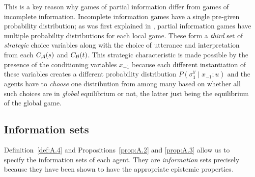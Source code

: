 This is a key reason why games of partial information differ from games of incomplete information. Incomplete information games have a single pre-given probability distribution; as was first explained in , partial information games have multiple probability distributions for each local game. These form a \emph{third} set of \emph{strategic} choice variables along with the choice of utterance and interpretation from each $C_{\cal A}(s)$ and $C_{\cal B}(t)$. This strategic characteristic is made possible by the presence of the conditioning variables $x_{-1}$ because each different instantiation of these variables creates a different probability distribution $P(\sigma_1^{y} \mid x_{-1}; u)$ and the agents have to \emph{choose} one distribution from among many based on whether all such choices are in \emph{global} equilibrium or not, the latter just being the equilibrium of the global game.


\subsection{Information sets}\label{sec:A.4.5}

Definition~\ref{def:A.4} and Propositions~\ref{prop:A.2} and \ref{prop:A.3} allow us to specify the information sets of each agent. They are \emph{information} sets precisely because they have been shown to have the appropriate epistemic properties.

